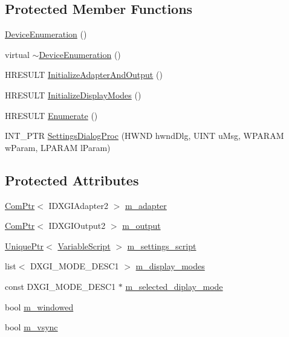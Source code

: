 \subsection*{Protected Member Functions}
\begin{DoxyCompactItemize}
\item 
\hyperlink{classmage_1_1_device_enumeration_aa000048648beb6c2aca70e5ef04e0da2}{Device\+Enumeration} ()
\item 
virtual \hyperlink{classmage_1_1_device_enumeration_a5124c80acce55a3d539665423f3872dc}{$\sim$\+Device\+Enumeration} ()
\item 
H\+R\+E\+S\+U\+LT \hyperlink{classmage_1_1_device_enumeration_a56806d9667b446bf14236b1f42aefb28}{Initialize\+Adapter\+And\+Output} ()
\item 
H\+R\+E\+S\+U\+LT \hyperlink{classmage_1_1_device_enumeration_ac4644c68492b919362e21f2e47fbad93}{Initialize\+Display\+Modes} ()
\item 
H\+R\+E\+S\+U\+LT \hyperlink{classmage_1_1_device_enumeration_a4fea0ffef733632456b281f74608a239}{Enumerate} ()
\item 
I\+N\+T\+\_\+\+P\+TR \hyperlink{classmage_1_1_device_enumeration_a5950a6575d9073d6d23b228779f5ace1}{Settings\+Dialog\+Proc} (H\+W\+ND hwnd\+Dlg, U\+I\+NT u\+Msg, W\+P\+A\+R\+AM w\+Param, L\+P\+A\+R\+AM l\+Param)
\end{DoxyCompactItemize}
\subsection*{Protected Attributes}
\begin{DoxyCompactItemize}
\item 
\hyperlink{namespacemage_ae74f374780900893caa5555d1031fd79}{Com\+Ptr}$<$ I\+D\+X\+G\+I\+Adapter2 $>$ \hyperlink{classmage_1_1_device_enumeration_af53e43c5c1d67421831993a5fdc6014a}{m\+\_\+adapter}
\item 
\hyperlink{namespacemage_ae74f374780900893caa5555d1031fd79}{Com\+Ptr}$<$ I\+D\+X\+G\+I\+Output2 $>$ \hyperlink{classmage_1_1_device_enumeration_a49580b67748053ed6172d6458b5083ca}{m\+\_\+output}
\item 
\hyperlink{namespacemage_a8c307fbcc33bce9b7f2aa4c26c3b95cf}{Unique\+Ptr}$<$ \hyperlink{classmage_1_1_variable_script}{Variable\+Script} $>$ \hyperlink{classmage_1_1_device_enumeration_ab6a58580daf27bff07ba7df428833616}{m\+\_\+settings\+\_\+script}
\item 
list$<$ D\+X\+G\+I\+\_\+\+M\+O\+D\+E\+\_\+\+D\+E\+S\+C1 $>$ \hyperlink{classmage_1_1_device_enumeration_aae356ac476a35ce4074f61cfd75ecdbe}{m\+\_\+display\+\_\+modes}
\item 
const D\+X\+G\+I\+\_\+\+M\+O\+D\+E\+\_\+\+D\+E\+S\+C1 $\ast$ \hyperlink{classmage_1_1_device_enumeration_a74b32839bda6446db56aaf4b6dd25f20}{m\+\_\+selected\+\_\+diplay\+\_\+mode}
\item 
bool \hyperlink{classmage_1_1_device_enumeration_a277c5dae7861c9cb1175192a61274cc9}{m\+\_\+windowed}
\item 
bool \hyperlink{classmage_1_1_device_enumeration_a027220f50649c40785e2b918411adfad}{m\+\_\+vsync}
\end{DoxyCompactItemize}
